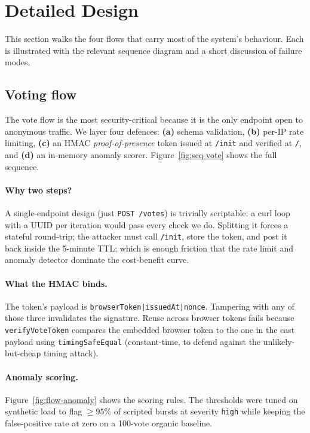 \section{Detailed Design}
\label{sec:design}

This section walks the four flows that carry most of the system's behaviour.
Each is illustrated with the relevant sequence diagram and a short
discussion of failure modes.

\subsection{Voting flow}
\label{sub:vote-flow}

The vote flow is the most security-critical because it is the only
endpoint open to anonymous traffic. We layer four defences:
\textbf{(a)} schema validation, \textbf{(b)} per-IP rate limiting,
\textbf{(c)} an HMAC \emph{proof-of-presence} token issued at \texttt{/init}
and verified at \texttt{/}, and \textbf{(d)} an in-memory anomaly scorer.
Figure~\ref{fig:seq-vote} shows the full sequence.


\paragraph{Why two steps?} A single-endpoint design (just \texttt{POST /votes})
is trivially scriptable: a curl loop with a UUID per iteration would pass
every check we do. Splitting it forces a stateful round-trip; the
attacker must call \texttt{/init}, store the token, and post it back inside
the 5-minute TTL; which is enough friction that the rate limit and
anomaly detector dominate the cost-benefit curve.

\paragraph{What the HMAC binds.} The token's payload is
\texttt{browserToken|issuedAt|nonce}. Tampering with any of those three
invalidates the signature. Reuse across browser tokens fails because
\texttt{verifyVoteToken} compares the embedded browser token to the one
in the cast payload using \texttt{timingSafeEqual} (constant-time, to
defend against the unlikely-but-cheap timing attack).

\paragraph{Anomaly scoring.} Figure~\ref{fig:flow-anomaly} shows the
scoring rules. The thresholds were tuned on synthetic load to flag
$\geq 95\%$ of scripted bursts at severity \texttt{high} while keeping
the false-positive rate at zero on a 100-vote organic baseline.

